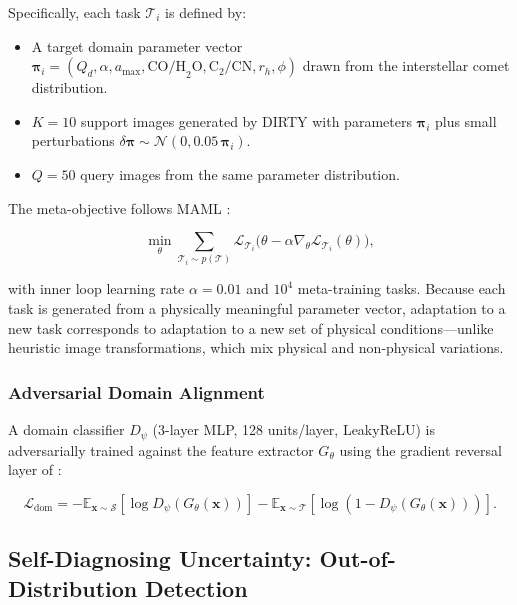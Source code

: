 \documentclass[preprint2]{aastex631}
\begin{document}
Specifically, each task $\mathcal{T}_i$ is defined by:
\begin{itemize}
    \item A target domain parameter vector $\boldsymbol{\pi}_i = (Q_d, \alpha, a_{\max}, \text{CO/H}_2\text{O}, \text{C}_2/\text{CN}, r_h, \phi)$ drawn from the interstellar comet distribution.
    \item $K=10$ support images generated by DIRTY with parameters $\boldsymbol{\pi}_i$ plus small perturbations $\delta\boldsymbol{\pi} \sim \mathcal{N}(0, 0.05\,\boldsymbol{\pi}_i)$.
    \item $Q=50$ query images from the same parameter distribution.
\end{itemize}

The meta-objective follows MAML \citep{finn17}:

\begin{equation}\label{eq:maml}
\min_\theta \sum_{\mathcal{T}_i \sim p(\mathcal{T})}
\mathcal{L}_{\mathcal{T}_i}\bigl(\theta - \alpha \nabla_\theta \mathcal{L}_{\mathcal{T}_i}(\theta)\bigr),
\end{equation}

with inner loop learning rate $\alpha = 0.01$ and $10^4$ meta-training tasks. Because each task is generated from a physically meaningful parameter vector, adaptation to a new task corresponds to adaptation to a new set of physical conditions---unlike heuristic image transformations, which mix physical and non-physical variations.

\subsubsection{Adversarial Domain Alignment}

A domain classifier $D_\psi$ (3-layer MLP, 128 units/layer, LeakyReLU) is adversarially trained against the feature extractor $G_\theta$ using the gradient reversal layer of \citet{ganin16}:

\begin{equation}\label{eq:adv_loss}
\mathcal{L}_{\text{dom}} = -\mathbb{E}_{\mathbf{x}\sim\mathcal{S}}[\log D_\psi(G_\theta(\mathbf{x}))] - \mathbb{E}_{\mathbf{x}\sim\mathcal{T}}[\log(1 - D_\psi(G_\theta(\mathbf{x})))].
\end{equation}

\subsection{Self-Diagnosing Uncertainty: Out-of-Distribution Detection}\label{sec:ood}
\end{document}
